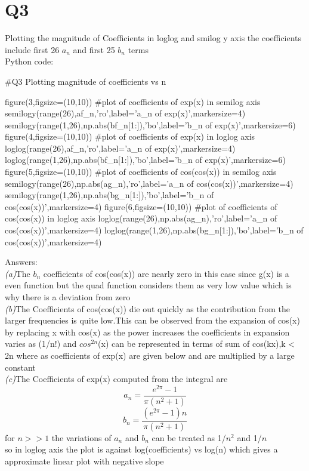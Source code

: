 \documentclass[12pt, a4paper]{report}
\begin{document}
 \section*{Q3}
 Plotting the magnitude of Coefficients in loglog and smilog y axis the coefficients include first 26 $a_n$ and first 25 $b_n$  terms \\
 
 Python code:
\begin{py_code}
#Q3 Plotting magnitude of coefficients vs n

figure(3,figsize=(10,10))       #plot of coefficients  of exp(x) in semilog axis             
semilogy(range(26),af_n,'ro',label='a_n of exp(x)',markersize=4)
semilogy(range(1,26),np.abs(bf_n[1:]),'bo',label='b_n of exp(x)',markersize=6)
figure(4,figsize=(10,10))   #plot of coefficients  of exp(x) in loglog axis
loglog(range(26),af_n,'ro',label='a_n of exp(x)',markersize=4)
loglog(range(1,26),np.abs(bf_n[1:]),'bo',label='b_n of exp(x)',markersize=6)
figure(5,figsize=(10,10))  #plot of coefficients  of cos(cos(x)) in semilog axis              
semilogy(range(26),np.abs(ag_n),'ro',label='a_n of cos(cos(x))',markersize=4)
semilogy(range(1,26),np.abs(bg_n[1:]),'bo',label='b_n of  cos(cos(x))',markersize=4)
figure(6,figsize=(10,10))  #plot of coefficients  of cos(cos(x)) in loglog axis
loglog(range(26),np.abs(ag_n),'ro',label='a_n of cos(cos(x))',markersize=4)
loglog(range(1,26),np.abs(bg_n[1:]),'bo',label='b_n of cos(cos(x))',markersize=4)
\end{py_code}

Answers:\\
\emph{(a)}The $b_n$ coefficients of cos(cos(x)) are nearly zero in this case since g(x) is a even function but the quad function considers them as very low value which is why there is a deviation from zero\\
\emph{(b)}The Coefficients of cos(cos(x)) die out quickly as the contribution from the larger frequencies is quite low.This can be observed from the expansion of cos(x) by replacing x with cos(x) as the power increases the coefficients in expansion varies as (1/n!) and $cos^{2n}$(x) can be represented  in terms of sum of cos(kx),k < 2n where as coefficients of exp(x) are given below and are multiplied by a large constant\\ 
\emph{(c)}The Coefficients of exp(x) computed from the integral are 
\begin{equation}
         a_{n} = \frac{e^{2\pi} - 1}{\pi(n^2 + 1)}        
\end{equation}
\begin{equation}
         b_{n} = \frac{(e^{2\pi} - 1)n}{\pi(n^2 + 1)}        
\end{equation}
for $n>>1$ the variations of $a_n$ and $b_n$ can be treated as 1/$n^2$ and 1/$n$\\
so in loglog axis the plot is against log(coefficients) vs log(n) which gives a  approximate linear plot with negative slope\\
\end{document}
